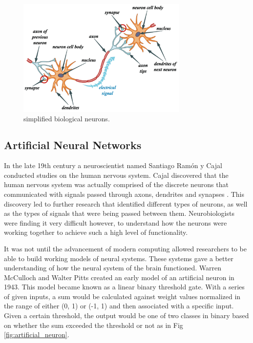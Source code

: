 \documentclass[12pt, a4paper, twoside]{report}
\begin{document}
\begin{figure}[ht]
	\centering
	\includegraphics[width=0.75\textwidth]
	{images/chapter4/biological_neuron}
	\caption{simplified biological neurons.}
	\label{fig:biological_neuron}
\end{figure}

\subsection{Artificial Neural Networks}
In the late 19th century a neuroscientist named Santiago Ramón y Cajal conducted studies on the human nervous system. Cajal discovered that the human nervous system was actually comprised of the discrete neurons that communicated with signals passed through axons, dendrites and synapses . This discovery led to further research that identified different types of neurons, as well as the types of signals that were being passed between them. Neurobiologists were finding it very difficult however, to understand how the neurons were working together to achieve such a high level of functionality.
\par
It was not until the advancement of modern computing allowed researchers to be able to build working models of neural systems. These systems gave a better understanding of how the neural system of the brain functioned. Warren McCulloch and Walter Pitts created an early model of an artificial neuron in 1943. This model became known as a linear binary threshold gate. With a series of given inputs, a sum would be calculated against weight values normalized in the range of either (0, 1) or (-1, 1) and then associated with a specific input. Given a certain threshold, the output would be one of two classes in binary based on whether the sum exceeded the threshold or not as in Fig \ref{fig:artificial_neuron}.
\end{document}
